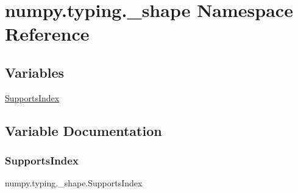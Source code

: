 \hypertarget{namespacenumpy_1_1typing_1_1__shape}{}\section{numpy.\+typing.\+\_\+shape Namespace Reference}
\label{namespacenumpy_1_1typing_1_1__shape}
\subsection*{Variables}
\begin{DoxyCompactItemize}
\item 
\hyperlink{namespacenumpy_1_1typing_1_1__shape_a2f68703e2590c18801732d739441c360}{Supports\+Index}
\end{DoxyCompactItemize}


\subsection{Variable Documentation}
\mbox{\label{namespacenumpy_1_1typing_1_1__shape_a2f68703e2590c18801732d739441c360}} 
\subsubsection{\texorpdfstring{Supports\+Index}{SupportsIndex}}
{\footnotesize\ttfamily numpy.\+typing.\+\_\+shape.\+Supports\+Index}

